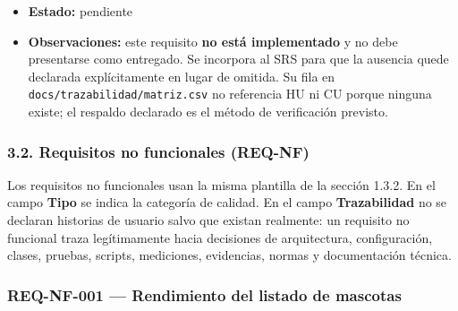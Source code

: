 \documentclass[
  spanish,
]{article}
\begin{document}
\begin{itemize}
  se deberán crear la historia y el caso de uso correspondientes, con el
  siguiente identificador libre de cada serie, al planificar su
  implementación. Sin endpoint, servicio, entidad de token ni migración
  en el repositorio actual: la búsqueda de
  \texttt{recuperar\textbar{}reset\textbar{}\allowbreak{}forgot\textbar{}olvid} sobre
  \texttt{Backend/\allowbreak{}src} y \texttt{frontend/\allowbreak{}src} no devuelve ninguna
  coincidencia.
\item
  \textbf{Estado:} pendiente
\item
  \textbf{Observaciones:} este requisito \textbf{no está implementado} y
  no debe presentarse como entregado. Se incorpora al SRS para que la
  ausencia quede declarada explícitamente en lugar de omitida. Su fila
  en \texttt{docs/\allowbreak{}trazabilidad/\allowbreak{}matriz.\allowbreak{}csv} no referencia HU ni CU porque
  ninguna existe; el respaldo declarado es el método de verificación
  previsto.
\end{itemize}

\subsubsection{3.2. Requisitos no funcionales
(REQ-NF)}\label{requisitos-no-funcionales-req-nf}

Los requisitos no funcionales usan la misma plantilla de la sección
1.3.2. En el campo \textbf{Tipo} se indica la categoría de calidad. En
el campo \textbf{Trazabilidad} no se declaran historias de usuario salvo
que existan realmente: un requisito no funcional traza legítimamente
hacia decisiones de arquitectura, configuración, clases, pruebas,
scripts, mediciones, evidencias, normas y documentación técnica.

\subsubsection{REQ-NF-001 --- Rendimiento del listado de
mascotas}\label{req-nf-001-rendimiento-del-listado-de-mascotas}
\end{document}
